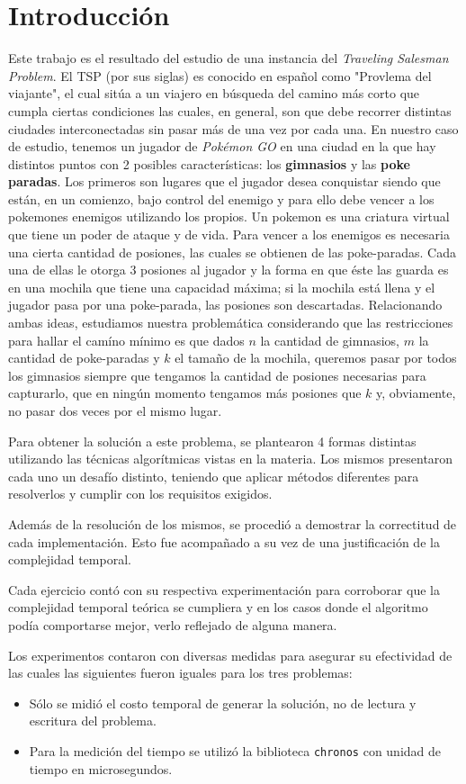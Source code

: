 \section{Introducción}

Este trabajo es el resultado del estudio de una instancia del \textit{Traveling Salesman Problem}. El TSP (por sus siglas) es conocido en español como "Provlema del viajante", el cual sitúa a un viajero en búsqueda del camino más corto que cumpla ciertas condiciones las cuales, en general, son que debe recorrer distintas ciudades interconectadas sin pasar más de una vez por cada una. En nuestro caso de estudio, tenemos un jugador de \textit{Pokémon GO} en una ciudad en la que hay distintos puntos con 2 posibles características: los \textbf{gimnasios} y las \textbf{poke paradas}. Los primeros son lugares que el jugador desea conquistar siendo que están, en un comienzo, bajo control del enemigo y para ello debe vencer a los pokemones enemigos utilizando los propios. Un pokemon es una criatura virtual que tiene un poder de ataque y de vida. Para vencer a los enemigos es necesaria una cierta cantidad de posiones, las cuales se obtienen de las poke-paradas. Cada una de ellas le otorga 3 posiones al jugador y la forma en que éste las guarda es en una mochila que tiene una capacidad máxima; si la mochila está llena y el jugador pasa por una poke-parada, las posiones son descartadas. Relacionando ambas ideas, estudiamos nuestra problemática considerando que las restricciones para hallar el camíno mínimo es que dados $n$ la cantidad de gimnasios, $m$ la cantidad de poke-paradas y $k$ el tamaño de la mochila, queremos pasar por todos los gimnasios siempre que tengamos la cantidad de posiones necesarias para capturarlo, que en ningún momento tengamos más posiones que $k$ y, obviamente, no pasar dos veces por el mismo lugar.

Para obtener la solución a este problema, se plantearon 4 formas distintas utilizando las técnicas algorítmicas vistas en la materia. Los mismos presentaron cada uno un desafío distinto, teniendo que aplicar métodos diferentes para resolverlos y cumplir con los requisitos exigidos.

Además de la resolución de los mismos, se procedió a demostrar la correctitud de
cada implementación. Esto fue acompañado a su vez de una justificación de la
complejidad temporal.

Cada ejercicio contó con su respectiva experimentación para corroborar que la
complejidad temporal teórica se cumpliera y en los casos donde el algoritmo
podía comportarse mejor, verlo reflejado de alguna manera.

Los experimentos contaron con diversas medidas para asegurar su efectividad de
las cuales las siguientes fueron iguales para los tres problemas:
\begin{itemize}
	\item{Sólo se midió el costo temporal de generar la solución, no
			de lectura y escritura del problema.}
	\item{Para la medición del tiempo se utilizó la biblioteca \texttt{chronos}
			con unidad de tiempo en microsegundos.}
\end{itemize}
